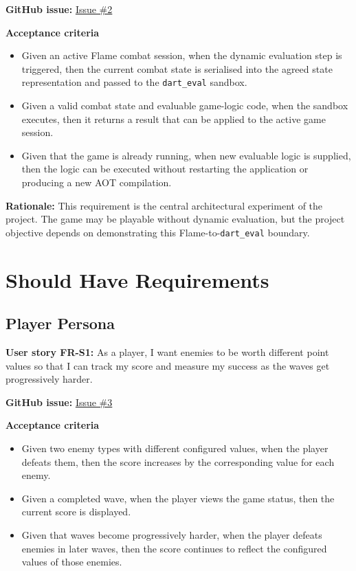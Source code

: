 \documentclass[12pt,a4paper]{article}
\begin{document}
\textbf{GitHub issue:} \href{https://github.com/nexuma/tower-defence-final-project/issues/2}{Issue \#2}

\par\medskip
\noindent\textbf{Acceptance criteria}
\par\smallskip
\begin{itemize}[leftmargin=1.5em,itemsep=0.35em,topsep=0.2em]
    \item Given an active Flame combat session, when the dynamic evaluation
    step is triggered, then the current combat state is serialised into the
    agreed state representation and passed to the \texttt{dart\_eval} sandbox.
    \item Given a valid combat state and evaluable game-logic code, when the
    sandbox executes, then it returns a result that can be applied to the
    active game session.
    \item Given that the game is already running, when new evaluable logic is
    supplied, then the logic can be executed without restarting the application
    or producing a new AOT compilation.
\end{itemize}

\par\medskip
\textbf{Rationale:} This requirement is the central architectural experiment
of the project. The game may be playable without dynamic evaluation, but the
project objective depends on demonstrating this Flame-to-\texttt{dart\_eval}
boundary.

\section{Should Have Requirements}
\label{sec:should-have}

\subsection{Player Persona}

\textbf{User story FR-S1:} As a player, I want enemies to be worth different point
values so that I can track my score and measure my success as the waves get
progressively harder.

\textbf{GitHub issue:} \href{https://github.com/nexuma/tower-defence-final-project/issues/3}{Issue \#3}

\par\medskip
\noindent\textbf{Acceptance criteria}
\par\smallskip
\begin{itemize}[leftmargin=1.5em,itemsep=0.35em,topsep=0.2em]
    \item Given two enemy types with different configured values, when the
    player defeats them, then the score increases by the corresponding value
    for each enemy.
    \item Given a completed wave, when the player views the game status, then
    the current score is displayed.
    \item Given that waves become progressively harder, when the player
    defeats enemies in later waves, then the score continues to reflect the
    configured values of those enemies.
\end{itemize}
\end{document}
